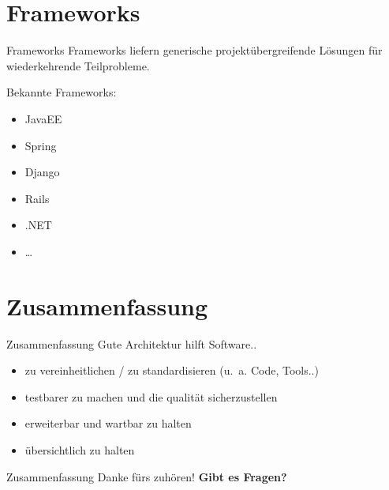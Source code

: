 \documentclass{beamer}
\begin{document}
\section{Frameworks}

\begin{frame}{Frameworks}
	Frameworks liefern generische projektübergreifende Lösungen für wiederkehrende Teilprobleme.

	\vspace{0.5em}

	Bekannte Frameworks:

	\begin{itemize}
		\item{JavaEE}
		\item{Spring}
		\item{Django}
		\item{Rails}
		\item{.NET}
		\item{\dots}
	\end{itemize}
\end{frame}


\section{Zusammenfassung}

\begin{frame}{Zusammenfassung}
	Gute Architektur hilft Software..
	\begin{itemize}
		\item zu vereinheitlichen / zu standardisieren (u.\ a. Code, Tools..)
		\item testbarer zu machen und die qualität sicherzustellen
		\item erweiterbar und wartbar zu halten
		\item übersichtlich zu halten
	\end{itemize}
\end{frame}

\begin{frame}{Zusammenfassung}
	Danke fürs zuhören! \textbf{Gibt es Fragen?}
\end{frame}
\end{document}
